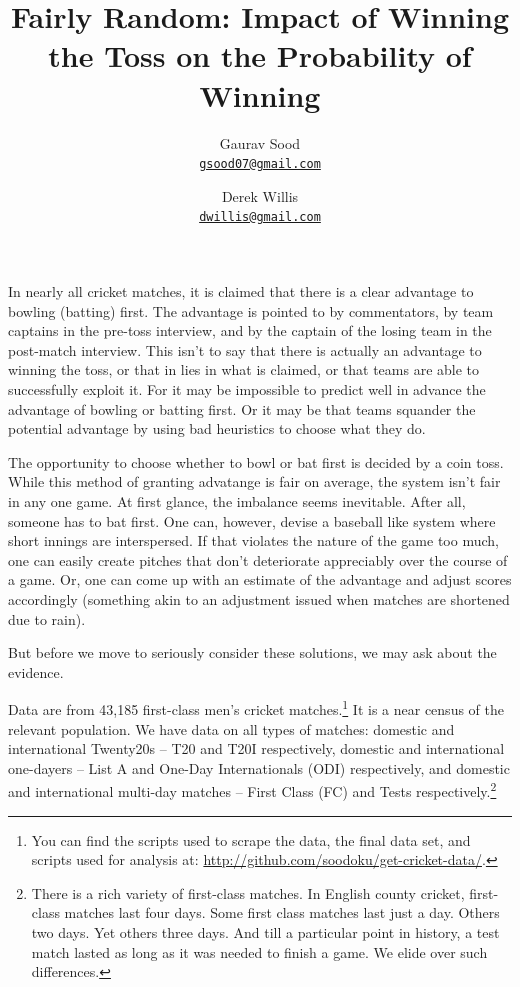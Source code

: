\documentclass[11pt]{article}
\begin{document}
\title{\vspace{-1.5cm}\normalsize{\textbf{Fairly Random: Impact of Winning the Toss on the Probability of Winning}}}
\author{Gaurav Sood\\\small{\href{mailto:gsood07@gmail.com}{\tt{gsood07@gmail.com}}} \and Derek Willis\\\small{\href{mailto:dwillis@gmail.com}{\tt{dwillis@gmail.com}}}}
\maketitle
\doublespacing

In nearly all cricket matches, it is claimed that there is a clear advantage to bowling (batting) first. The advantage is pointed to by commentators, by team captains in the pre-toss interview, and by the captain of the losing team in the post-match interview. This isn't to say that there is actually an advantage to winning the toss, or that in lies in what is claimed, or that teams are able to successfully exploit it. For it may be impossible to predict well in advance the advantage of bowling or batting first. Or it may be that teams squander the potential advantage by using bad heuristics to choose what they do.

The opportunity to choose whether to bowl or bat first is decided by a coin toss. While this method of granting advatange is fair on average, the system isn't fair in any one game. At first glance, the imbalance seems inevitable. After all, someone has to bat first. One can, however, devise a baseball like system where short innings are interspersed. If that violates the nature of the game too much, one can easily create pitches that don't deteriorate appreciably over the course of a game. Or, one can come up with an estimate of the advantage and adjust scores accordingly (something akin to an adjustment issued when matches are shortened due to rain).

But before we move to seriously consider these solutions, we may ask about the evidence.

Data are from 43,185 first-class men's cricket matches.\footnote{You can find the scripts used to scrape the data, the final data set, and scripts used for analysis at: \href{http://github.com/soodoku/get-cricket-data/}{http://github.com/soodoku/get-cricket-data/}.} It is a near census of the relevant population. We have data on all types of matches: domestic and international Twenty20s -- T20 and T20I respectively, domestic and international one-dayers -- List A and One-Day Internationals (ODI) respectively, and domestic and international multi-day matches -- First Class (FC) and Tests respectively.\footnote{There is a rich variety of first-class matches. In English county cricket, first-class matches last four days. Some first class matches last just a day. Others two days. Yet others three days. And till a particular point in history, a test match lasted as long as it was needed to finish a game. We elide over such differences.} 
\end{document}
